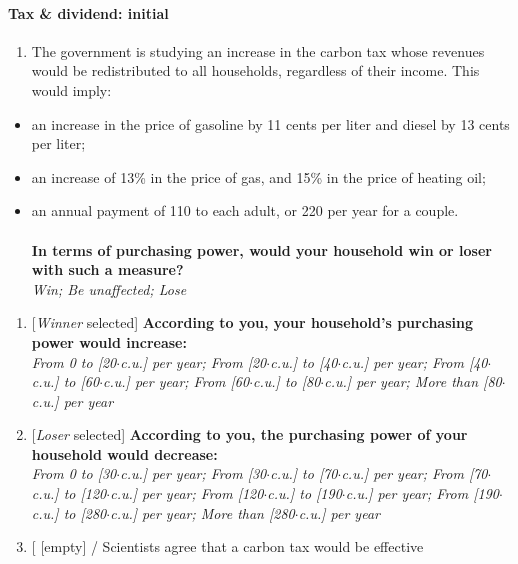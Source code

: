 \documentclass[12pt]{article} %
\begin{document}
\begin{appendices}
\paragraph{Tax \& dividend: initial}
\begin{enumerate}[resume,leftmargin=*]
\item \label{questionnaire:TD}The government is studying an increase in the carbon tax whose revenues
would be redistributed to all households, regardless of their income.
This would imply: 
\end{enumerate}
\begin{itemize}
\item an increase in the price of gasoline by 11 cents per liter and diesel
by 13 cents per liter; 
\item an increase of 13\% in the price of gas, and 15\% in the price of
heating oil;
\item an annual payment of 110\euros{} to each adult, or 220\euros{} per year for a couple.
\\
\\
\textbf{In terms of purchasing power, would your household win or
loser with such a measure? }\emph{}\\
\emph{Win; Be unaffected; Lose}
\end{itemize}
\begin{enumerate}[resume,leftmargin=*]
\item {[}\emph{Winner} selected{]} \textbf{According to you, your household's
purchasing power would increase:} \emph{}\\
\emph{From 0 to {[}20$\cdot$c.u.{]} \euros{} per year; From {[}20$\cdot$c.u.{]}
to {[}40$\cdot$c.u.{]} \euros{} per year; From {[}40$\cdot$c.u.{]} to {[}60$\cdot$c.u.{]}
\euros{} per year; From {[}60$\cdot$c.u.{]} to {[}80$\cdot$c.u.{]} \euros{} per year;
More than {[}80$\cdot$c.u.{]} \euros{} per year}
\item {[}\emph{Loser} selected{]} \textbf{According to you, the purchasing
power of your household would decrease:} \emph{}\\
\emph{From 0 to {[}30$\cdot$c.u.{]} \euros{} per year; From {[}30$\cdot$c.u.{]}
to {[}70$\cdot$c.u.{]} \euros{} per year; From {[}70$\cdot$c.u.{]} to {[}120$\cdot$c.u.{]}
\euros{} per year; From {[}120$\cdot$c.u.{]} to {[}190$\cdot$c.u.{]} \euros{} per
year; From {[}190$\cdot$c.u.{]} to {[}280$\cdot$c.u.{]} \euros{} per year;
More than {[}280$\cdot$c.u.{]} \euros{} per year} 
\item {[} {[}empty{]} / Scientists agree that a carbon tax would be effective

\end{enumerate}
\end{appendices}
\end{document}
